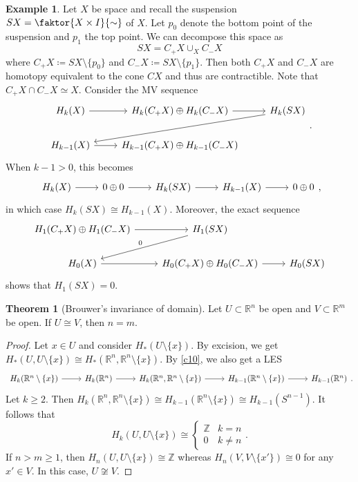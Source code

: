 \documentclass[10pt,letterpaper,cm]{nupset}
\theoremstyle{definition}
\newtheorem{exmp}[definition]{Example}
\theoremstyle{theorem}
\newtheorem{theorem}[definition]{Theorem}
\theoremstyle{remark}
\newcommand{\R}{\mathbb{R}}
\newcommand{\Z}{\mathbb Z}
\newcommand{\1}{\mathbb{1}}
\newcommand{\0}{\vec 0}
\begin{document}
\begin{exmp}
Let $X$ be space and recall the suspension $S{X}= \faktor{X \times I}{\sim}$ of $X$. Let $p_0$ denote the bottom point of the suspension and $p_1$ the top point. We can decompose this space as $$ S{X} = C_+{X} \cup_X C_{-}{X} $$ where $C_+{X} \coloneqq  S{X} \setminus \{p_0\}$ and $C_{-}{X} \coloneqq S{X} \setminus \{p_1\}$. Then both $C_+{X}$ and $C_{-}{X}$ are homotopy equivalent to the cone $C{X}$ and thus are contractible. Note that $ C_+{X} \cap C_{-}{X} \simeq X$. Consider the MV sequence
\[
\begin{tikzcd}
H_k(X) \arrow[r] & H_k(C_+{X})\oplus H_k(C_{-}{X}) \arrow[r] & H_k(S{X}) \arrow[lld] \\
H_{k-1}(X) \arrow[r]                    & H_{k-1}(C_+{X})\oplus H_{k-1}(C_{-}{X})   &                           
\end{tikzcd}
.\] When $k-1>0$, this becomes
\[
\begin{tikzcd}
H_k(X) \arrow[r] & 0\oplus 0 \arrow[r] & H_k(S{X}) \arrow[r] &
H_{k-1}(X) \arrow[r]                    & 0\oplus 0                           
\end{tikzcd},
\] in which case $H_k(S{X}) \cong H_{k-1}(X)$. Moreover, the exact sequence
\[
\begin{tikzcd}
H_1(C_+{X})\oplus H_1(C_{-}{X}) \arrow[r] & H_1(S{X}) \arrow[ld, "0"']             &                \\
H_0(X) \arrow[r]                          & H_0(C_{+}{X})\oplus H_0(C_{-}{X}) \arrow[r] & H_0(S{X})
\end{tikzcd}
\] shows that $H_1(S{X}) =0$.
\end{exmp}

\begin{theorem}[Brouwer's invariance of domain]
Let $U\subset \R^n$ be open and $V\subset \R^m$ be open. If $U \cong V$, then $n=m$.
\end{theorem}
\begin{proof}
Let $x\in U$ and consider $H_{\ast}(U \setminus \{x\})$. By excision, we get $H_{\ast}(U, U \setminus \{x\}) \cong H_{\ast}(\R^n, \R^n \setminus \{x\})$. By \cref{c10}, we also get a LES
\[
\begin{tikzcd}
H_{k}(\R^n \setminus \{x\}) \arrow[r] & H_{k}(\R^n) \arrow[r] & {H_{k}(\R^n, \R^n \setminus \{x\})} \arrow[r] & H_{k-1}(\R^n \setminus \{x\}) \arrow[r] & H_{k -1}(\R^n)
\end{tikzcd}
. \] Let $k\geq 2$. Then $H_k(\R^n, \R^n \setminus \{x\}) \cong H_{k-1}(\R^n \setminus \{x\}) \cong H_{k-1}(S^{n-1}).$ It follows that $$H_k(U, U \setminus \{x\}) \cong \begin{cases} \Z & k=n \\ 0 & k \ne n \end{cases}.$$ If $n >m \geq 1$, then $H_n(U, U \setminus \{x\}) \cong \Z$ whereas $H_n(V, V \setminus \{x'\}) \cong 0$ for any $x' \in V$. In this case, $U \not \cong V$.
\end{proof}
\end{document}
